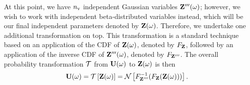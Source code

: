 At this point, we have ${n_\text{v}}$ independent Gaussian variables $\mathbf{Z}'''(\omega)$; however, we wish to work with independent beta-distributed variables instead, which will be our final independent parameters denoted by $\mathbf{Z}(\omega)$.
Therefore, we undertake one additional transformation on top.
This transformation is a standard technique \cite{durrett2010} based on an application of the CDF of $\mathbf{Z}(\omega)$, denoted by $F_{\mathbf{Z}}$, followed by an application of the inverse CDF of $\mathbf{Z}'''(\omega)$, denoted by $F_{\mathbf{Z}'''}$. The overall probability transformation $\oTransform$ from $\mathbf{U}(\omega)$ to $\mathbf{Z}(\omega)$ is then
\[
  \vU(\o) = \oTransform{\vZ(\o)} = \oNataf{\CDF^{-1}_{\vZ'''}(\CDF_{\vZ}(\vZ(\o)))}.
\]
